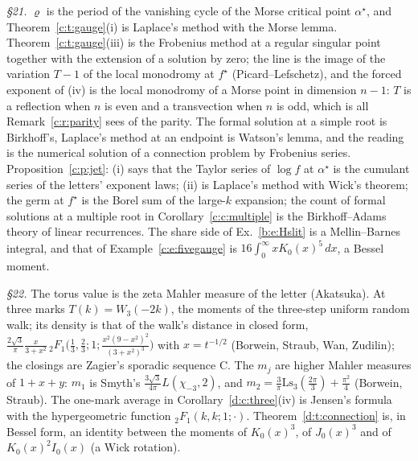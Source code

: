 \documentclass[11pt]{article}
\theoremstyle{plain}
\theoremstyle{definition}
\theoremstyle{remark}
\begin{document}
\noindent\emph{\S21.} $\varrho$ is the period of the vanishing cycle of the Morse critical point $\alpha^\star$, and Theorem~\ref{c:t:gauge}(i) is Laplace's method with the Morse lemma. Theorem~\ref{c:t:gauge}(iii) is the Frobenius method at a regular singular point together with the extension of a solution by zero; the line is the image of the variation $T-1$ of the local monodromy at $f^\star$ (Picard--Lefschetz), and the forced exponent of (iv) is the local monodromy of a Morse point in dimension $n-1$: $T$ is a reflection when $n$ is even and a transvection when $n$ is odd, which is all Remark~\ref{c:r:parity} sees of the parity. The formal solution at a simple root is Birkhoff's, Laplace's method at an endpoint is Watson's lemma, and the reading is the numerical solution of a connection problem by Frobenius series. Proposition~\ref{c:p:jet}: (i) says that the Taylor series of $\log f$ at $\alpha^\star$ is the cumulant series of the letters' exponent laws; (ii) is Laplace's method with Wick's theorem; the germ at $f^\star$ is the Borel sum of the large-$k$ expansion; the count of formal solutions at a multiple root in Corollary~\ref{c:c:multiple} is the Birkhoff--Adams theory of linear recurrences. The share side of Ex.~\ref{b:e:Hslit} is a Mellin--Barnes integral, and that of Example~\ref{c:e:fivegauge} is $16\int_0^\infty xK_0(x)^5\,dx$, a Bessel moment.

\noindent\emph{\S22.} The torus value is the zeta Mahler measure of the letter (Akatsuka). At three marks $T(k)=W_3(-2k)$, the moments of the three-step uniform random walk; its density is that of the walk's distance in closed form, $\frac{2\sqrt3}\pi\frac x{3+x^2}\,{}_2F_1\big(\frac13,\frac23;1;\frac{x^2(9-x^2)^2}{(3+x^2)^3}\big)$ with $x=t^{-1/2}$ (Borwein, Straub, Wan, Zudilin); the closings are Zagier's sporadic sequence C. The $m_j$ are higher Mahler measures of $1+x+y$: $m_1$ is Smyth's $\frac{3\sqrt3}{4\pi}L(\chi_{-3},2)$, and $m_2=\frac3\pi\mathrm{Ls}_3(\frac{2\pi}3)+\frac{\pi^2}4$ (Borwein, Straub). The one-mark average in Corollary~\ref{d:c:three}(iv) is Jensen's formula with the hypergeometric function ${}_2F_1(k,k;1;\cdot)$. Theorem~\ref{d:t:connection} is, in Bessel form, an identity between the moments of $K_0(x)^3$, of $J_0(x)^3$ and of $K_0(x)^2I_0(x)$ (a Wick rotation).
\end{document}
